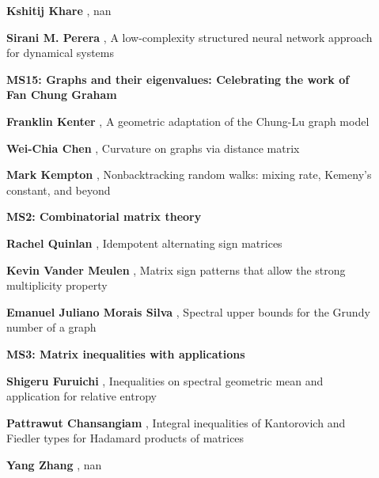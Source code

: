 \documentclass[ILAS2025-program.tex]{subfiles}
\begin{document}
\begin{description}
\begin{description}
        \item[] \textbf{Kshitij Khare} , nan
        \item[] \textbf{Sirani M. Perera} , A low-complexity structured neural network approach for dynamical systems
        \end{description}
    \begin{description}
    \item[] {\color{mstitle}\textbf{MS15: Graphs and their eigenvalues: Celebrating the work of Fan Chung Graham}} 
    \item[] \textbf{Franklin Kenter} , A geometric adaptation of the Chung-Lu graph model
        \item[] \textbf{Wei-Chia Chen} , Curvature on graphs via distance matrix
        \item[] \textbf{Mark Kempton} , Nonbacktracking random walks: mixing rate, Kemeny's constant, and beyond
        \end{description}
    \begin{description}
    \item[] {\color{mstitle}\textbf{MS2: Combinatorial matrix theory}} 
    \item[] \textbf{Rachel Quinlan} , Idempotent alternating sign matrices
        \item[] \textbf{Kevin Vander Meulen} , Matrix sign patterns that allow the strong multiplicity property
        \item[] \textbf{Emanuel Juliano Morais Silva} , Spectral upper bounds for the Grundy number of a graph
        \end{description}
    \begin{description}
    \item[] {\color{mstitle}\textbf{MS3: Matrix inequalities with applications}} 
    \item[] \textbf{Shigeru Furuichi} , Inequalities on spectral geometric mean and application for relative entropy
        \item[] \textbf{Pattrawut Chansangiam} , Integral inequalities of Kantorovich and Fiedler types for Hadamard products of matrices
        \item[] \textbf{Yang Zhang} , nan

\end{description}
\end{description}
\end{document}
